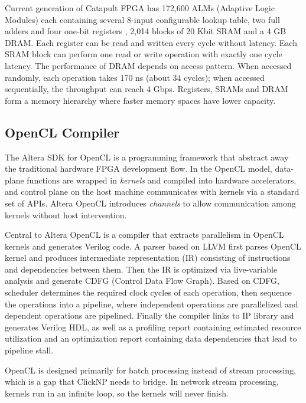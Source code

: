 {Current generation of Catapult FPGA has 172,600 ALMs (Adaptive Logic Modules) each containing several 8-input configurable lookup table, two full adders and four one-bit registers \cite{alterafpgaarch}, 2,014 blocks of 20 Kbit SRAM and a 4 GB DRAM. Each register can be read and written every cycle without latency. Each SRAM block can perform one read or write operation with exactly one cycle latency. The performance of DRAM depends on access pattern. When accessed randomly, each operation takes 170 ns (about 34 cycles); when accessed sequentially, the throughput can reach 4 Gbps. Registers, SRAMs and DRAM form a memory hierarchy where faster memory spaces have lower capacity.

\subsection{OpenCL Compiler}

The Altera SDK for OpenCL \cite{singh2011implementing} is a programming framework that abstract away the traditional hardware FPGA development flow. In the OpenCL \cite{khronos2008opencl} model, data-plane functions are wrapped in \textit{kernels} and compiled into hardware accelerators, and control plane on the host machine communicates with kernels via a standard set of APIs. Altera OpenCL introduces \textit{channels} to allow communication among kernels without host intervention.

Central to Altera OpenCL is a compiler \cite{czajkowski2012opencl} that extracts parallelism in OpenCL kernels and generates Verilog code. A parser based on LLVM first parses OpenCL kernel and produces intermediate representation (IR) consisting of instructions and dependencies between them. Then the IR is optimized via live-variable analysis and generate CDFG (Control Data Flow Graph). Based on CDFG, scheduler determines the required clock cycles of each operation, then sequence the operations into a pipeline, where independent operations are parallelized and dependent operations are pipelined. Finally the compiler links to IP library and generates Verilog HDL, as well as a profiling report containing estimated resource utilization and an optimization report containing data dependencies that lead to pipeline stall.

OpenCL is designed primarily for batch processing instead of stream processing, which is a gap that ClickNP needs to bridge. In network stream processing, kernels run in an infinite loop, so the kernels will never finish.

}
